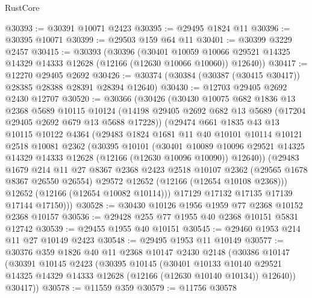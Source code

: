 \begin{lexlean}{RustCore}
\begin{coremodule}
@30393 := @30391 @10071 @2423
@30395 := @29495 @1824 @11
@30396 := @30395 @10071
@30399 := @29503 @159 @64 @11
@30401 := @30399 @3229 @2457
@30415 := @30393
    (@30396
      (@30401
        @10059
        @10066
        @29521
        @14325
        @14329
        @14333
        @12628
        (@12166 (@12630 @10066 @10060))
        @12640))
@30417 := @12270 @29405 @2692
@30426 := @30374 (@30384 (@30387 (@30415 @30417)) @28385 @28388 @28391 @28394 @12640)
@30430 := @12703 @29405 @2692 @2430 @12707
@30520 := @30366
    (@30426
      (@30430
        @10075
        @682
        @1836
        @13
        @2368
        @5689
        @10115
        @10124
        (@14198 @29405 @2692 @682 @13 @5689 (@17204 @29405 @2692 @679 @13 @5688 @17228))
        (@29474
          @661
          @1835
          @43
          @13
          @10115
          @10122
          @4364
          (@29483
            @1824
            @1681
            @11
            @40
            @10101
            @10114
            @10121
            @2518
            @10081
            @2362
            (@30395
              @10101
              (@30401
                @10089
                @10096
                @29521
                @14325
                @14329
                @14333
                @12628
                (@12166 (@12630 @10096 @10090))
                @12640))
            (@29483
              @1679
              @214
              @11
              @27
              @8367
              @2368
              @2423
              @2518
              @10107
              @2362
              (@29565 @1678 @8367 @26550 @26554)
              @29572
              @12652
              (@12166 (@12654 @10108 @2368)))
            @12652
            (@12166 (@12654 @10082 @10114)))
          @17129
          @17132
          @17135
          @17139
          @17144
          @17150)))
@30528 := @30430 @10126 @1956 @1959 @77 @2368 @10152 @2368 @10157
@30536 := @29428 @255 @77 @1955 @40 @2368 @10151 @5831 @12742
@30539 := @29455 @1955 @40 @10151
@30545 := @29460 @1953 @214 @11 @27 @10149 @2423
@30548 := @29495 @1953 @11 @10149
@30577 := @30376
    @359
    @1826
    @40
    @11
    @2368
    @10147
    @2430
    @2148
    (@30386
      @10147
      (@30391
        @10145
        @2423
        (@30395
          @10145
          (@30401
            @10133
            @10140
            @29521
            @14325
            @14329
            @14333
            @12628
            (@12166 (@12630 @10140 @10134))
            @12640))
        @30417))
@30578 := @11559 @359
@30579 := @11756 @30578

\end{coremodule}
\end{lexlean}
